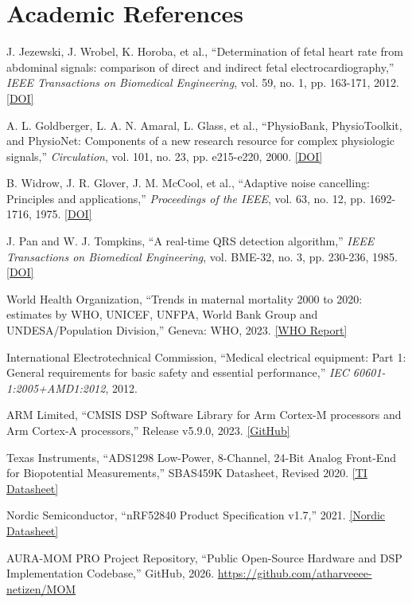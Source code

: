 \documentclass[10pt,a4paper]{article}
\begin{document}
\section{Academic References}

\begin{enumerate}[label={[\arabic*]},leftmargin=2em]
    \item J. Jezewski, J. Wrobel, K. Horoba, et al., ``Determination of fetal heart rate from abdominal signals: comparison of direct and indirect fetal electrocardiography,'' \textit{IEEE Transactions on Biomedical Engineering}, vol. 59, no. 1, pp. 163-171, 2012. \href{https://doi.org/10.1109/TBME.2011.2171683}{[DOI]}
    \item A. L. Goldberger, L. A. N. Amaral, L. Glass, et al., ``PhysioBank, PhysioToolkit, and PhysioNet: Components of a new research resource for complex physiologic signals,'' \textit{Circulation}, vol. 101, no. 23, pp. e215-e220, 2000. \href{https://doi.org/10.1161/01.CIR.101.23.e215}{[DOI]}
    \item B. Widrow, J. R. Glover, J. M. McCool, et al., ``Adaptive noise cancelling: Principles and applications,'' \textit{Proceedings of the IEEE}, vol. 63, no. 12, pp. 1692-1716, 1975. \href{https://doi.org/10.1109/PROC.1975.10036}{[DOI]}
    \item J. Pan and W. J. Tompkins, ``A real-time QRS detection algorithm,'' \textit{IEEE Transactions on Biomedical Engineering}, vol. BME-32, no. 3, pp. 230-236, 1985. \href{https://doi.org/10.1109/TBME.1985.325532}{[DOI]}
    \item World Health Organization, ``Trends in maternal mortality 2000 to 2020: estimates by WHO, UNICEF, UNFPA, World Bank Group and UNDESA/Population Division,'' Geneva: WHO, 2023. \href{https://www.who.int/publications/i/item/9789240068759}{[WHO Report]}
    \item International Electrotechnical Commission, ``Medical electrical equipment: Part 1: General requirements for basic safety and essential performance,'' \textit{IEC 60601-1:2005+AMD1:2012}, 2012.
    \item ARM Limited, ``CMSIS DSP Software Library for Arm Cortex-M processors and Arm Cortex-A processors,'' Release v5.9.0, 2023. \href{https://github.com/ARM-software/CMSIS-DSP}{[GitHub]}
    \item Texas Instruments, ``ADS1298 Low-Power, 8-Channel, 24-Bit Analog Front-End for Biopotential Measurements,'' SBAS459K Datasheet, Revised 2020. \href{https://www.ti.com/lit/ds/symlink/ads1298.pdf}{[TI Datasheet]}
    \item Nordic Semiconductor, ``nRF52840 Product Specification v1.7,'' 2021. \href{https://infocenter.nordicsemi.com/pdf/nRF52840_PS_v1.7.pdf}{[Nordic Datasheet]}
    \item AURA-MOM PRO Project Repository, ``Public Open-Source Hardware and DSP Implementation Codebase,'' GitHub, 2026. \href{https://github.com/atharveeee-netizen/MOM}{https://github.com/atharveeee-netizen/MOM}
\end{enumerate}
\end{document}
